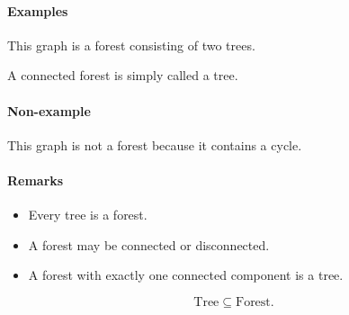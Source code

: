 \documentclass[11pt]{article}
\theoremstyle{plain}
\theoremstyle{definition}
\theoremstyle{remark}
\begin{document}
\paragraph{Examples}

\begin{center}
\end{center}

This graph is a forest consisting of two trees.

A connected forest is simply called a tree.

\paragraph{Non-example}

\begin{center}
\end{center}

This graph is not a forest because it contains a cycle.

\paragraph{Remarks}

\begin{itemize}
    \item Every tree is a forest.
    \item A forest may be connected or disconnected.
    \item A forest with exactly one connected component is a tree.
\end{itemize}

\[
\boxed{\text{Tree}\subseteq\text{Forest}.}
\]
\end{document}

